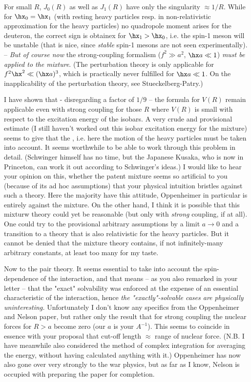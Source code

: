 For small $R$, $J_0(R)$ as well as $J_1(R)$ have only the singularity $\approx 1/R$. While for $\hx_0 = \hx_1$ (with resting heavy particles resp. in non-relativistic approximation for the heavy particles) no quadropole moment arises for the deuteron, the correct sign is obtainex for $\hx_1 > \hx_0$, i.e. the spin-1 meson will be unstable (that is nice, since \textit{stable} spin-1 mesons are not seen experimentally). -- \textit{But of course now} the strong-coupling formalism ($f^2 \gg a^2$, $\hx a \ll 1$) \textit{must be applied to the mixture}. (The perturbation theory is only applicable for $f^2 \hx^2 \ll (\hx a)^3$, which is practically never fulfilled for $\hx a \ll 1$. On the inapplicability of the perturbation theory, see Stueckelberg-Patry.) 

I have shown that - disregarding a factor of $1/9$ -- the formula for $V(R)$ remain applicable even with strong coupling for those $R$ where $V(R)$ is small with respect to the excitation energy of the isobars. A very crude and provisional estimate (I still haven't worked out this isobar excitation energy for the mixture) seems to give that the , i.e. here the motion of the heavy particles must be taken into account. It seems worthwhile to be able to work through this problem in detail. (Schwinger himself has no time, but the Japanese Kusaka, who is now in Princeton, can work it out according to Schwinger's ideas.) I would like to hear your opinion on this, whether the patent mixture seems so artificial to you (because of its ad hoc assumptions) that your physical intuition bristles against such a theory. Here the majority have this attitude, Oppenheimer in particular is entirely against the mixture. On the other hand, I think it is possible that this mixturw theory could yet be reasonable (but only with \textit{strong} coupling, if at all). One could try to  the provisional arbitrary assumptions by a limit $a \to 0$ and a transition to a theory that is also relativistic for the heavy particles. But it cannot be denied that the mixture theory contains, if not infinitely-many arbitrary constants, at least too many for my taste.

Now to the pair theory. It seems essential to take into account the spin-dependence of the interaction, and that means -- as you also remarked in your letter -- that the "exact" solvability was enforced at the expense of an essential characteristic of the interaction, hence \textit{the "exactly"-solvable cases are physically uninteresting.} Unfortunately I don't know any specifics from the Oppenheimer and Nelson paper, but rather only the result that for strong coupling the nuclear forces for $R>a$ become zero (our $a$ is your $A^{-1}$). This seems to coincide in essence with your proposal that cut-off length $\approx$ range of nuclear force. (N.B. I have meanwhile also considered the method of complex integration for averaging the energy, without having calculated anything with it.) Oppenheimer has now also gone over very strongly to the war physics, but as far as I know, Nelson is occupied with preparing the paper for completion.

